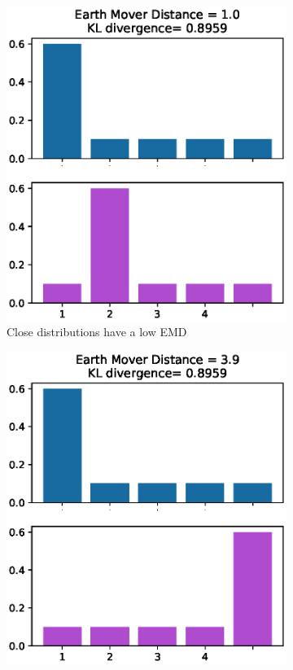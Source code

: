 \begin{figure}[ht]
    \begin{subfigure}{.5\textwidth}
        \centering
        \includegraphics[width=1.0\linewidth]{figures/graphs/EMDvsKLclose.eps}
        \caption{Close distributions have a low EMD}
        \label{fig:LIFSingleSpikeGraph}
    \end{subfigure}%
    \begin{subfigure}{.5\textwidth}
        \centering
        \includegraphics[width=1.0\linewidth]{figures/graphs/EMDvsKLfar.eps}

\end{subfigure}
\end{figure}
